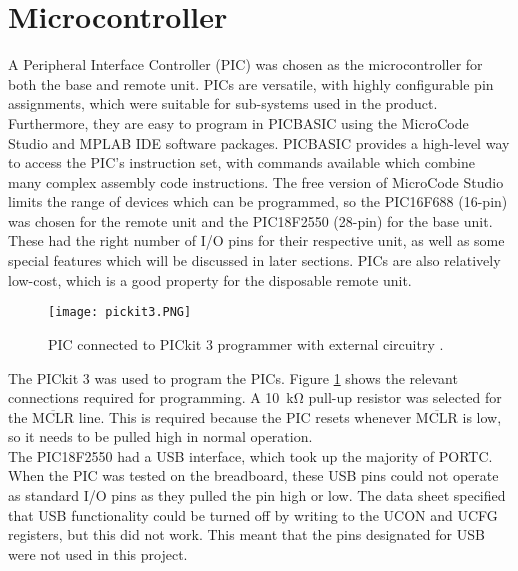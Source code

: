 \section{Microcontroller}
A Peripheral Interface Controller (PIC) was chosen as the microcontroller for both the base and remote unit. PICs are versatile, with highly configurable pin assignments, which were suitable for sub-systems used in the product. Furthermore, they are easy to program in PICBASIC using the MicroCode Studio \cite{microcode_studio} and MPLAB IDE software packages. PICBASIC provides a high-level way to access the PIC's instruction set, with commands available which combine many complex assembly code instructions. The free version of MicroCode Studio limits the range of devices which can be programmed, so the PIC16F688 (16-pin) \cite{pic16f688} was chosen for the remote unit and the PIC18F2550 (28-pin) \cite{pic18f2550} for the base unit. These had the right number of I/O pins for their respective unit, as well as some special features which will be discussed in later sections. PICs are also relatively low-cost, which is a good property for the disposable remote unit.\\

\begin{figure}[htbp]
	\centering
	\texttt{[image: pickit3.PNG]}
	\caption{PIC connected to PICkit 3 programmer with external circuitry \cite{pickit3}.}
	\label{fig: pickit3}
\end{figure}

The PICkit 3 \cite{pickit3} was used to program the PICs. Figure \ref{fig: pickit3} shows the relevant connections required for programming. A \SI{10}{\kilo\ohm} pull-up resistor was selected for the $\overline{\text{MCLR}}$ line. This is required because the PIC resets whenever $\overline{\text{MCLR}}$ is low, so it needs to be pulled high in normal operation. \\

The PIC18F2550 had a USB interface, which took up the majority of PORTC. When the PIC was tested on the breadboard, these USB pins could not operate as standard I/O pins as they pulled the pin high or low. The data sheet specified that USB functionality could be turned off by writing to the UCON and UCFG registers, but this did not work. This meant that the pins designated for USB were not used in this project.\\
